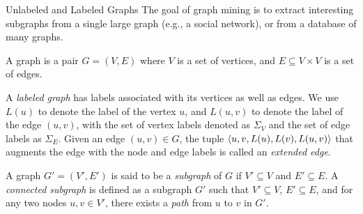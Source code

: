 
\date{Chapter 11: Graph Pattern Mining}

\begin{frame}
\titlepage
\end{frame}

\begin{frame}{Unlabeled and Labeled Graphs}
The goal of graph mining is to extract interesting subgraphs from a
single large graph (e.g., a social network), or from a database of many
graphs. 

\medskip
A graph is a pair $G = (V,E)$ where $V$ is a set of vertices, and
$E \subseteq V \times V$ is a set of edges. 

\medskip
A {\em labeled graph} has labels associated with its
vertices as well as edges. We use $L(u)$ to denote the label of
the vertex $u$, and $L(u,v)$ to denote the label of the edge
$(u,v)$, with the set of vertex labels denoted as $\Sigma_V$ and the
set of edge labels as $\Sigma_E$. Given an edge $(u,v) \in G$,
the tuple $\langle u, v, L(u), L(v), L(u,v) \rangle$ that augments the
edge with the node and
edge labels is called an {\em extended edge}.

\medskip
A graph $G'=(V',E')$ is said to be a {\em
subgraph} of $G$ if $V' \subseteq V$ and $E' \subseteq E$.
A {\em
connected subgraph} is def\/{i}ned as a subgraph $G'$ such that
$V' \subseteq V$, $E' \subseteq E$, and
for any two nodes $u, v \in V'$,
there exists a {\em path} from $u$ to $v$ in $G'$.

\end{frame}

